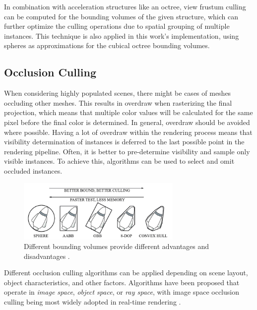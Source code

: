 \noindent
In combination with acceleration structures like an octree, view frustum culling can be computed for the bounding 
volumes of the given structure, which can further optimize the culling operations due to spatial grouping of multiple 
instances. This technique is also applied in this work's implementation, using spheres as approximations for the 
cubical octree bounding volumes.
\enlargethispage{\baselineskip}
\enlargethispage{\baselineskip}

\subsection*{Occlusion Culling} \label{subsec-point-based-occlusion-culling}

When considering highly populated scenes, there might be cases of meshes occluding other meshes. This results 
in overdraw when rasterizing the final projection, which means that multiple color values will be calculated 
for the same pixel before the final color is determined. In general, overdraw should be avoided where possible. 
Having a lot of overdraw within the rendering process means that visibility determination of instances is deferred 
to the last possible point in the rendering pipeline. Often, it is better to pre-determine visibility and sample 
only visible instances. To achieve this, algorithms can be used to select and omit occluded instances. \\

\begin{figure}[h]
    \centering
    \includegraphics[width=300px]{images/graphics/bounding-volume-quality.jpg}
    \caption{Different bounding volumes provide different advantages and disadvantages \cite{Six2021}.}
    \label{fig:bounding-volumes}
\end{figure}

\noindent
Different occlusion culling algorithms can be applied depending on scene layout, object characteristics, and other 
factors. Algorithms have been proposed that operate in \emph{image space}, \emph{object space}, or \emph{ray space}, 
with image space occlusion culling being most widely adopted in real-time rendering \cite{AkenineMoeller2018}. \\

